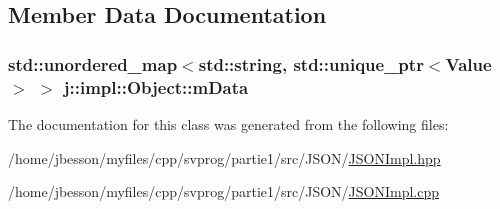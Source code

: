 \subsection{Member Data Documentation}
\hypertarget{classj_1_1impl_1_1_object_a43ac128967a0872b5edf707cd21c8676}{
\subsubsection[{m\-Data}]{\setlength{\rightskip}{0pt plus 5cm}std\-::unordered\-\_\-map$<$std\-::string, std\-::unique\-\_\-ptr$<${\bf Value}$>$ $>$ j\-::impl\-::\-Object\-::m\-Data\hspace{0.3cm}{\ttfamily [private]}}}\label{classj_1_1impl_1_1_object_a43ac128967a0872b5edf707cd21c8676}


The documentation for this class was generated from the following files\-:\begin{DoxyCompactItemize}
\item 
/home/jbesson/myfiles/cpp/svprog/partie1/src/\-J\-S\-O\-N/\hyperlink{_j_s_o_n_impl_8hpp}{J\-S\-O\-N\-Impl.\-hpp}\item 
/home/jbesson/myfiles/cpp/svprog/partie1/src/\-J\-S\-O\-N/\hyperlink{_j_s_o_n_impl_8cpp}{J\-S\-O\-N\-Impl.\-cpp}\end{DoxyCompactItemize}
